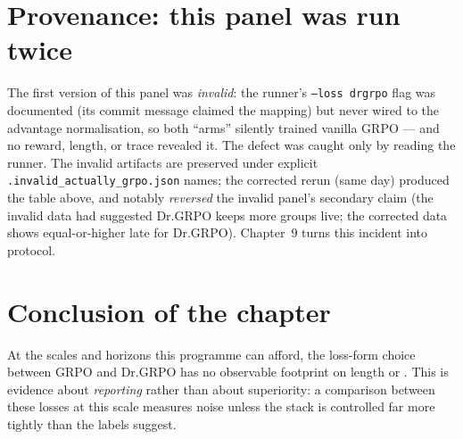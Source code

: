 \section{Provenance: this panel was run twice}
The first version of this panel was \emph{invalid}: the runner's
\texttt{--loss drgrpo} flag was documented (its commit message claimed the
mapping) but never wired to the advantage normalisation, so both ``arms''
silently trained vanilla GRPO --- and no reward, length, or \ZVF{} trace
revealed it. The defect was caught only by reading the runner. The invalid
artifacts are preserved under explicit \texttt{.invalid\_actually\_grpo.json}
names; the corrected rerun (same day) produced the table above, and notably
\emph{reversed} the invalid panel's secondary claim (the invalid data had
suggested Dr.GRPO keeps more groups live; the corrected data shows
equal-or-higher late \ZVF{} for Dr.GRPO). Chapter~9 turns this incident into
protocol.

\section{Conclusion of the chapter}
At the scales and horizons this programme can afford, the loss-form choice
between GRPO and Dr.GRPO has no observable footprint on length or \ZVF{}.
This is evidence about \emph{reporting} rather than about superiority: a
comparison between these losses at this scale measures noise unless the stack
is controlled far more tightly than the labels suggest.
